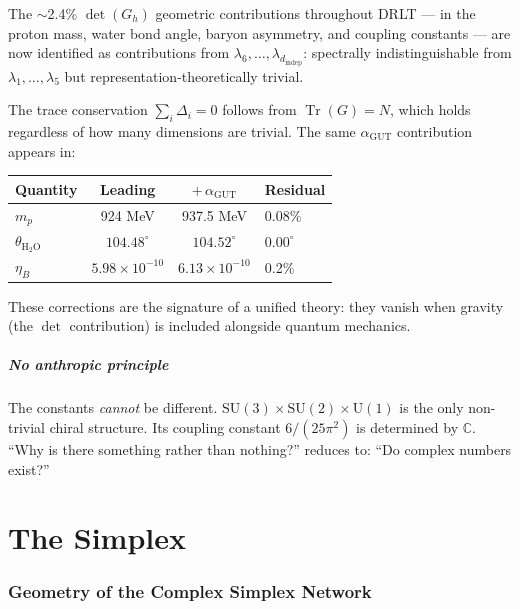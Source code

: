 \documentclass[12pt]{article}
\theoremstyle{remark}
\theoremstyle{definition}
\newcommand{\CC}{\mathbb{C}}
\newcommand{\tr}{\operatorname{Tr}}
\newcommand{\agut}{\alpha_{\mathrm{GUT}}}
\begin{document}
The $\sim$2.4\% $\det(G_h)$ geometric contributions throughout DRLT --- in the proton mass, water bond angle, baryon asymmetry, and coupling constants --- are now identified as contributions from $\lambda_6, \ldots, \lambda_{d_\text{indep}}$: spectrally indistinguishable from $\lambda_1, \ldots, \lambda_5$ but representation-theoretically trivial.

The trace conservation $\sum_i \Delta_i = 0$ follows from $\tr(G) = N$, which holds regardless of how many dimensions are trivial. The same $\agut$ contribution appears in:

\begin{center}
\begin{tabular}{lccl}
\hline
Quantity & Leading & $+\,\agut$ & Residual \\
\hline
$m_p$ & 924 MeV & 937.5 MeV & 0.08\% \\
$\theta_{\text{H}_2\text{O}}$ & $104.48^\circ$ & $104.52^\circ$ & $0.00^\circ$ \\
$\eta_B$ & $5.98 \times 10^{-10}$ & $6.13 \times 10^{-10}$ & 0.2\% \\
\hline
\end{tabular}
\end{center}

These corrections are the signature of a unified theory: they vanish when gravity (the $\det$ contribution) is included alongside quantum mechanics.

\subsubsection{No anthropic principle}

The constants \emph{cannot} be different. $\text{SU}(3)\times\text{SU}(2)\times\text{U}(1)$ is the only non-trivial chiral structure. Its coupling constant $6/(25\pi^2)$ is determined by $\CC$. ``Why is there something rather than nothing?'' reduces to: ``Do complex numbers exist?''

\part{The Simplex}

\section{Geometry of the Complex Simplex Network}
\label{ch:simplex_geometry}
\end{document}
